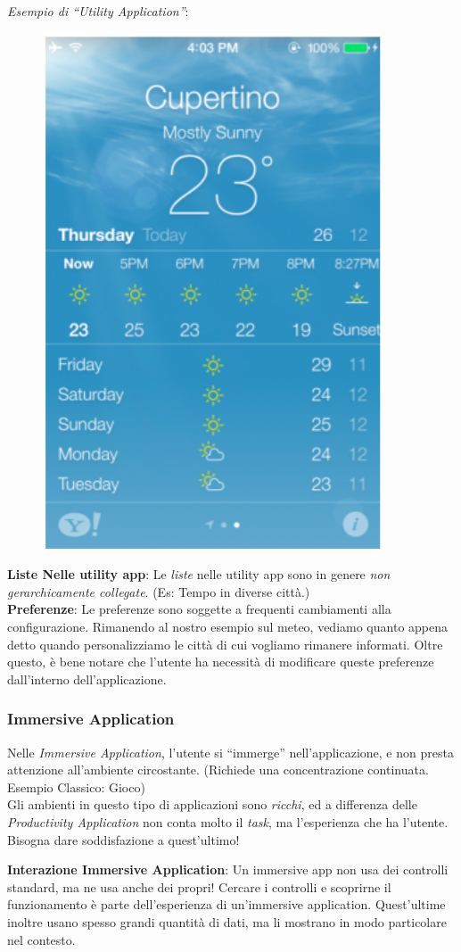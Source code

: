 \documentclass[oneside]{book}
\begin{document}
				\emph{Esempio di ``Utility Application''}: \\
				\begin{figure}[h]
				\centering%
				\includegraphics[height = 60 mm ]{images/meteo.png} \\
				\end{figure}

				\textbf{Liste Nelle utility app}: Le \emph{liste} nelle utility app sono in genere \emph{non gerarchicamente collegate}. (Es: Tempo in diverse città.) \\

				\textbf{Preferenze}: Le preferenze sono soggette a frequenti cambiamenti alla configurazione. Rimanendo al nostro esempio sul meteo, vediamo quanto appena detto quando personalizziamo le città di cui vogliamo rimanere informati. Oltre questo, è bene notare che l'utente ha necessità di modificare queste preferenze dall’interno dell’applicazione.

			\subsubsection{Immersive Application} \label{sez:immersiveApp}
				Nelle \emph{Immersive Application}, l'utente si ``immerge'' nell'applicazione, e non presta attenzione all'ambiente circostante. (Richiede una concentrazione continuata. Esempio Classico: Gioco) \\

				Gli ambienti in questo tipo di applicazioni sono \emph{ricchi}, ed a differenza delle \emph{Productivity Application} non conta molto il \emph{task}, ma l'esperienza che ha l'utente. Bisogna dare soddisfazione a quest'ultimo!

				\textbf{Interazione Immersive Application}: Un immersive app non usa dei controlli standard, ma ne usa anche dei propri! Cercare i controlli e scoprirne il funzionamento è parte dell’esperienza di un'immersive application. Quest'ultime inoltre usano spesso grandi quantità di dati, ma li mostrano in modo particolare nel contesto. \\
\end{document}
